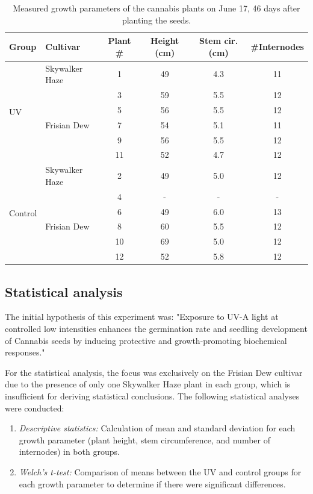 \begin{table}[htbp]
    \caption[Measured growth parameters of the cannabis plants]{Measured growth parameters of the cannabis plants on June 17, \num[mode=text]{46} days after planting the seeds.}
    \label{tab:measured_growth_parameters}
    \begin{tabularx}{\linewidth}{llcccc}
        \toprule
        \textbf{Group} & \textbf{Cultivar} & \textbf{Plant \#} & \textbf{Height (\unit[mode=text]{\cm})} & \textbf{Stem cir. (\unit[mode=text]{\cm})} & \textbf{\#{}Internodes} \\
        \midrule
        \multirow{6}{*}{UV} & Skywalker Haze & 1 & 49 & 4.3 & 11 \\
        & \multirow[t]{5}{*}{Frisian Dew} & 3 & 59 & 5.5 & 12 \\
        & & 5 & 56 & 5.5 & 12 \\
        & & 7 & 54 & 5.1 & 11 \\
        & & 9 & 56 & 5.5 & 12 \\
        & & 11 & 52 & 4.7 & 12 \\
        \midrule
        \multirow{6}{*}{Control} & Skywalker Haze & 2 & 49 & 5.0 & 12 \\
        & \multirow[t]{5}{*}{Frisian Dew} & 4 & - & - & - \\
        & & 6 & 49 & 6.0 & 13 \\
        & & 8 & 60 & 5.5 & 12 \\
        & & 10 & 69 & 5.0 & 12 \\
        & & 12 & 52 & 5.8 & 12 \\
        \bottomrule
    \end{tabularx}
\end{table}

\subsection{Statistical analysis}

The initial hypothesis of this experiment was: "Exposure to UV-A light at controlled low intensities enhances the germination rate and seedling development of Cannabis seeds by inducing protective and growth-promoting biochemical responses."

For the statistical analysis, the focus was exclusively on the Frisian Dew cultivar due to the presence of only one Skywalker Haze plant in each group, which is insufficient for deriving statistical conclusions. The following statistical analyses were conducted:
\begin{enumerate}
    \item \emph{Descriptive statistics:} Calculation of mean and standard deviation for each growth parameter (plant height, stem circumference, and number of internodes) in both groups.
    \item \emph{Welch's t-test:} Comparison of means between the UV and control groups for each growth parameter to determine if there were significant differences.
\end{enumerate}

